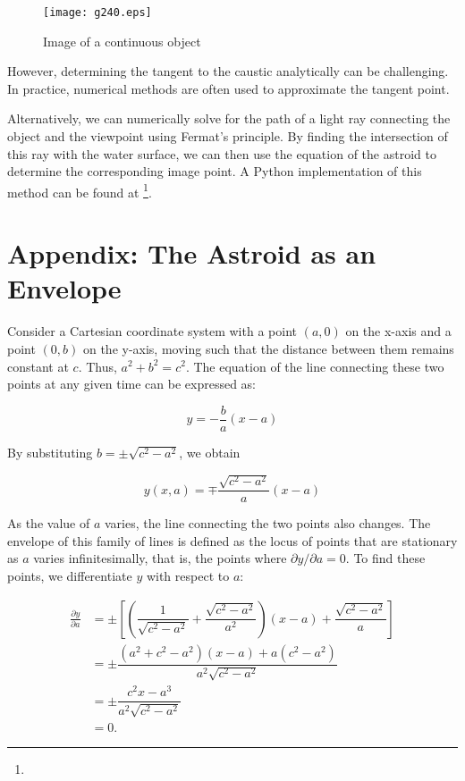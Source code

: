 \documentclass[twocolumn]{article}
\begin{document}
\begin{figure}[h]
	\centering
	\texttt{[image: g240.eps]}
	\caption{Image of a continuous object}
	\label{fig:extended_image}
\end{figure}

However, determining the tangent to the caustic analytically can be challenging. In practice, numerical methods are often used to approximate the tangent point.

Alternatively, we can numerically solve for the path of a light ray connecting the object and the viewpoint using Fermat's principle. By finding the intersection of this ray with the water surface, we can then use the equation of the astroid to determine the corresponding image point. A Python implementation of this method can be found at  \href{https://github.com/mingshey/python\_projects/blob/main/Refraction\_Image\_en.ipynb}{}\footnote{}.

\appendix
\newcommand{\pd}[2]{{\frac{\partial #1}{\partial #2}}}
\newcommand{\ilpd}[2]{{{\partial #1}/{\partial #2}}}
\section*{Appendix: The Astroid as an Envelope}

Consider a Cartesian coordinate system with a point $(a, 0)$ on the x-axis and a point $(0, b)$ on the y-axis, moving such that the distance between them remains constant at $c$. Thus, $a^2+b^2=c^2$. The equation of the line connecting these two points at any given time can be expressed as:

$$y=-\dfrac{b}{a}(x-a)$$

By substituting $b=\pm \sqrt{c^2-a^2}$, we obtain

$$y(x, a) = \mp \dfrac{\sqrt{c^2-a^2}}{a}(x-a)$$

As the value of $a$ varies, the line connecting the two points also changes. The envelope of this family of lines is defined as the locus of points that are stationary as $a$ varies infinitesimally, that is, the points where $\ilpd{y}{a} = 0$. To find these points, we differentiate $y$ with respect to $a$:

$$ \begin{aligned}
	\pd{y}{a} &= \pm\left[\left( \dfrac{1}{\sqrt{c^2-a^2}}+\dfrac{\sqrt{c^2-a^2}}{a^2}\right) (x-a) + \dfrac{\sqrt{c^2-a^2}}{a} \right]\\
	&= \pm \dfrac{(a^2+c^2-a^2)(x-a)+a(c^2-a^2)}{a^2\sqrt{c^2-a^2}}\\
	&= \pm \dfrac{c^2 x - a^3}{a^2 \sqrt{c^2 - a^2}}\\
	&= 0.
\end{aligned}
$$
\end{document}
